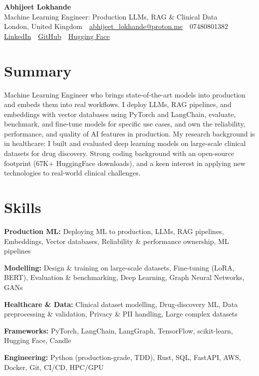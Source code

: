 \documentclass[10pt,a4paper]{article}
\newcommand{\sep}{\,\textcolor{accent!60}{\textbar}\,}
\begin{document}
\begin{center}
  {\fontsize{24}{26}\selectfont\bfseries Abhijeet Lokhande}\\[3pt]
  {\color{accent}\large Machine Learning Engineer: Production LLMs, RAG \& Clinical Data}\\[5pt]
  {\small
    London, United Kingdom \sep
    \href{mailto:abhijeet_lokhande@proton.me}{abhijeet\_lokhande@proton.me} \sep
    07480801382 \\[2pt]
    \href{https://www.linkedin.com/in/ablds/}{LinkedIn} \sep
    \href{https://github.com/abhijeetscode}{GitHub} \sep
    \href{https://huggingface.co/ab-ai}{Hugging Face}
  }
\end{center}
\vspace{2pt}

\section{Summary}
Machine Learning Engineer who brings state-of-the-art models into production and embeds them into real workflows. I deploy LLMs, RAG pipelines, and embeddings with vector databases using PyTorch and LangChain, evaluate, benchmark, and fine-tune models for specific use cases, and own the reliability, performance, and quality of AI features in production. My research background is in healthcare: I built and evaluated deep learning models on large-scale clinical datasets for drug discovery. Strong coding background with an open-source footprint (67K+ HuggingFace downloads), and a keen interest in applying new technologies to real-world clinical challenges.

\section{Skills}
\begin{tight}
  \item[\textcolor{accent}{\small$\bullet$}] \textbf{Production ML:} Deploying ML to production, LLMs, RAG pipelines, Embeddings, Vector databases, Reliability \& performance ownership, ML pipelines
  \item[\textcolor{accent}{\small$\bullet$}] \textbf{Modelling:} Design \& training on large-scale datasets, Fine-tuning (LoRA, BERT), Evaluation \& benchmarking, Deep Learning, Graph Neural Networks, GANs
  \item[\textcolor{accent}{\small$\bullet$}] \textbf{Healthcare \& Data:} Clinical dataset modelling, Drug-discovery ML, Data preprocessing \& validation, Privacy \& PII handling, Large complex datasets
  \item[\textcolor{accent}{\small$\bullet$}] \textbf{Frameworks:} PyTorch, LangChain, LangGraph, TensorFlow, scikit-learn, Hugging Face, Candle
  \item[\textcolor{accent}{\small$\bullet$}] \textbf{Engineering:} Python (production-grade, TDD), Rust, SQL, FastAPI, AWS, Docker, Git, CI/CD, HPC/GPU
\end{tight}
\end{document}
